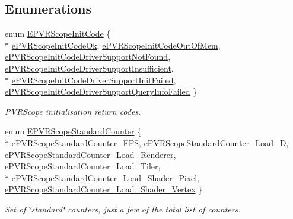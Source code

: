 \subsection*{Enumerations}
\begin{DoxyCompactItemize}
\item 
enum \hyperlink{group___scope_stats_gae53be0f580f9e1088efc1c06d94002d3}{E\+P\+V\+R\+Scope\+Init\+Code} \{ \\*
\hyperlink{group___scope_stats_ggae53be0f580f9e1088efc1c06d94002d3a03a9f90b6a77559a18331474440ff211}{e\+P\+V\+R\+Scope\+Init\+Code\+Ok}, 
\hyperlink{group___scope_stats_ggae53be0f580f9e1088efc1c06d94002d3a341d023f4fb6b7b492823e645f221711}{e\+P\+V\+R\+Scope\+Init\+Code\+Out\+Of\+Mem}, 
\hyperlink{group___scope_stats_ggae53be0f580f9e1088efc1c06d94002d3aaadb7255dba5c8426dbb3e6d13ea987d}{e\+P\+V\+R\+Scope\+Init\+Code\+Driver\+Support\+Not\+Found}, 
\hyperlink{group___scope_stats_ggae53be0f580f9e1088efc1c06d94002d3a20396b5b67ba5c2842ee1b80bae71e3b}{e\+P\+V\+R\+Scope\+Init\+Code\+Driver\+Support\+Insufficient}, 
\\*
\hyperlink{group___scope_stats_ggae53be0f580f9e1088efc1c06d94002d3aa94ba1ce834620972a1be2e8a2d72546}{e\+P\+V\+R\+Scope\+Init\+Code\+Driver\+Support\+Init\+Failed}, 
\hyperlink{group___scope_stats_ggae53be0f580f9e1088efc1c06d94002d3a0119ee96a570646839d978e046886994}{e\+P\+V\+R\+Scope\+Init\+Code\+Driver\+Support\+Query\+Info\+Failed}
 \}
\begin{DoxyCompactList}\small\item\em P\+V\+R\+Scope initialisation return codes. \end{DoxyCompactList}\item 
enum \hyperlink{group___scope_stats_gab88ac352edee5bc7263aaca13f3672ce}{E\+P\+V\+R\+Scope\+Standard\+Counter} \{ \\*
\hyperlink{group___scope_stats_ggab88ac352edee5bc7263aaca13f3672cea6a50c3a8b6bf6c30158101185b5fe98e}{e\+P\+V\+R\+Scope\+Standard\+Counter\+\_\+\+F\+P\+S}, 
\hyperlink{group___scope_stats_ggab88ac352edee5bc7263aaca13f3672cea4bb03f399c43755930342dde5c245671}{e\+P\+V\+R\+Scope\+Standard\+Counter\+\_\+\+Load\+\_\+D}, 
\hyperlink{group___scope_stats_ggab88ac352edee5bc7263aaca13f3672ceaff064962e64c26329e73f4e8da1baf9f}{e\+P\+V\+R\+Scope\+Standard\+Counter\+\_\+\+Load\+\_\+\+Renderer}, 
\hyperlink{group___scope_stats_ggab88ac352edee5bc7263aaca13f3672ceae10eca4f1c6ce9ca553092091ca5821b}{e\+P\+V\+R\+Scope\+Standard\+Counter\+\_\+\+Load\+\_\+\+Tiler}, 
\\*
\hyperlink{group___scope_stats_ggab88ac352edee5bc7263aaca13f3672ceaaa784703993777405822b46e678882f7}{e\+P\+V\+R\+Scope\+Standard\+Counter\+\_\+\+Load\+\_\+\+Shader\+\_\+\+Pixel}, 
\hyperlink{group___scope_stats_ggab88ac352edee5bc7263aaca13f3672ceaf1b15c540c3a659bd9089b887432771c}{e\+P\+V\+R\+Scope\+Standard\+Counter\+\_\+\+Load\+\_\+\+Shader\+\_\+\+Vertex}
 \}
\begin{DoxyCompactList}\small\item\em Set of \char`\"{}standard\char`\"{} counters, just a few of the total list of counters. \end{DoxyCompactList}\end{DoxyCompactItemize}
